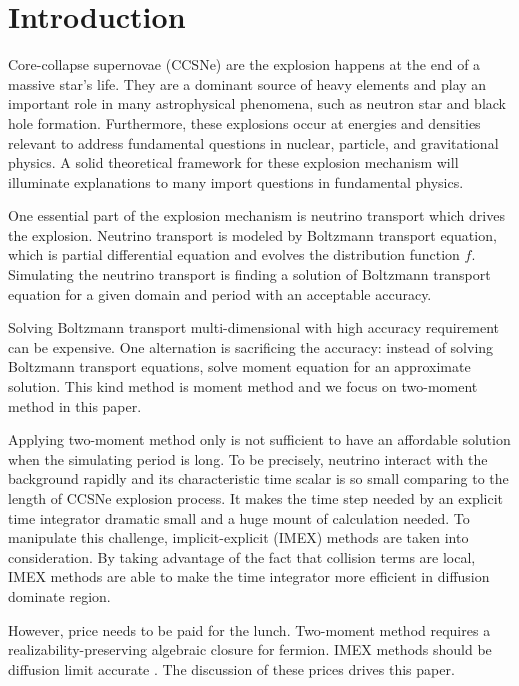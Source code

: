 \section{Introduction}

Core-collapse supernovae (CCSNe) are the explosion happens at the end of a massive star's life.
They are a dominant source of heavy elements and play an important role in many astrophysical phenomena, such as neutron star and black hole formation.  
Furthermore, these explosions occur at energies and densities relevant to address fundamental questions in nuclear, particle, and gravitational physics. 
A solid theoretical framework for these explosion mechanism will illuminate explanations to many import questions in fundamental physics.

One essential part of the explosion mechanism is neutrino transport which drives the explosion.  
Neutrino transport is modeled by Boltzmann transport equation, which is partial differential equation and evolves the distribution function $f$.
Simulating the neutrino transport is finding a solution of Boltzmann transport equation for a given domain and period with an acceptable accuracy.

Solving Boltzmann transport multi-dimensional with high accuracy requirement can be expensive.
One alternation is sacrificing the accuracy: instead of solving Boltzmann transport equations, solve moment equation for an approximate solution.
This kind method is moment method and we focus on two-moment method in this paper.

Applying two-moment method only is not sufficient to have an affordable solution when the simulating period is long.
To be precisely, neutrino interact with the background rapidly and its characteristic time scalar is so small comparing to the length of CCSNe explosion process. 
It makes the time step needed by an explicit time integrator dramatic small and a huge mount of calculation needed. 
To manipulate this challenge, implicit-explicit (IMEX) methods are taken into consideration.
By taking advantage of the fact that collision terms are local, IMEX methods are able to make the time integrator more efficient in diffusion dominate region.

However, price needs to be paid for the lunch.  
Two-moment method requires a realizability-preserving algebraic closure for fermion.
IMEX methods should be diffusion limit accurate . 
The discussion of these prices drives this paper. 


